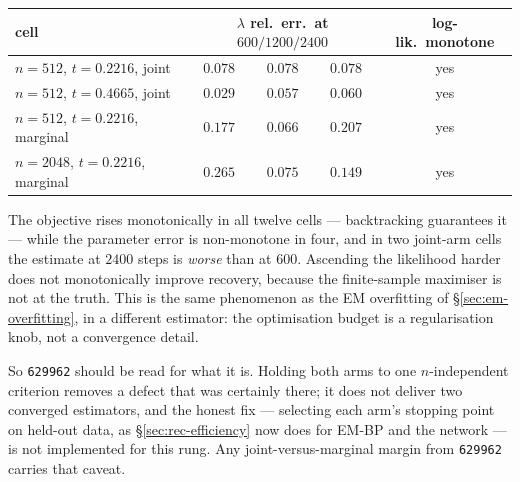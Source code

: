 \begin{center}\small
\begin{tabular}{lccc c}
\toprule
cell & \multicolumn{3}{c}{$\lambda$ rel.\ err.\ at $600 / 1200 / 2400$} & log-lik.\ monotone \\
\midrule
$n{=}512$, $t{=}0.2216$, joint    & $0.078$ & $0.078$ & $0.078$ & yes \\
$n{=}512$, $t{=}0.4665$, joint    & $0.029$ & $0.057$ & $0.060$ & yes \\
$n{=}512$, $t{=}0.2216$, marginal & $0.177$ & $0.066$ & $0.207$ & yes \\
$n{=}2048$, $t{=}0.2216$, marginal& $0.265$ & $0.075$ & $0.149$ & yes \\
\bottomrule
\end{tabular}
\end{center}

\noindent The objective rises monotonically in all twelve cells --- backtracking guarantees it ---
while the parameter error is non-monotone in four, and in two joint-arm cells the estimate at $2400$
steps is \emph{worse} than at $600$. Ascending the likelihood harder does not monotonically improve
recovery, because the finite-sample maximiser is not at the truth. This is the same phenomenon as
the EM overfitting of \S\ref{sec:em-overfitting}, in a different estimator: the optimisation budget
is a regularisation knob, not a convergence detail.

So \texttt{629962} should be read for what it is. Holding both arms to one $n$-independent
criterion removes a defect that was certainly there; it does not deliver two converged estimators,
and the honest fix --- selecting each arm's stopping point on held-out data, as
\S\ref{sec:rec-efficiency} now does for EM-BP and the network --- is not implemented for this rung.
Any joint-versus-marginal margin from \texttt{629962} carries that caveat.

